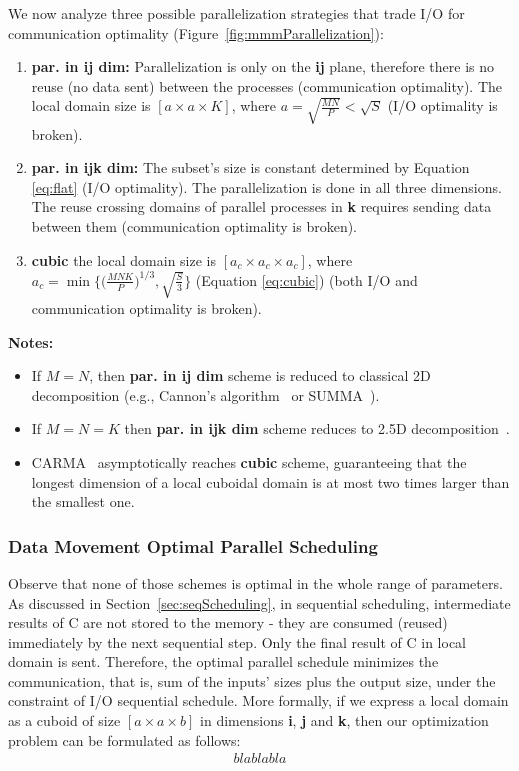 \documentclass[sigplan,review,anonymous]{acmart}\settopmatter{printfolios=true,printccs=false,printacmref=false}
\begin{document}
We now analyze three possible parallelization strategies that trade I/O for 
communication optimality (Figure~\ref{fig:mmmParallelization}):

\begin{enumerate}
	\item \textbf{par. in ij dim:} 
	Parallelization is only on the \textbf{ij} plane, therefore there is no 
	reuse 
	(no data sent) 
	between the processes (communication optimality). The local domain size is 
	$[a \times a \times K]$, where $a = \sqrt{\frac{MN}{P}} < \sqrt{S}$  (I/O 
	optimality is broken).
	\item \textbf{par. in ijk dim:} The subset's size is 
	constant determined by 
	Equation \ref{eq:flat} (I/O optimality). The parallelization is done in all 
	three dimensions. The reuse crossing domains of parallel processes in 
	\textbf{k} 
	requires sending data between them (communication optimality 
	is broken).
	\item \textbf{cubic} 
	the local domain size is 
	$[a_c \times a_c \times a_c]$, where $a_c = 
	\min\{\big(\frac{MNK}{P}\big)^{1/3}, 
	\sqrt{\frac{S}{3}}\}$ (Equation \ref{eq:cubic}) (both I/O and communication 
	optimality is broken).
\end{enumerate}

\textbf{Notes:}

\begin{itemize}
	\item If $M = N$, then \textbf{par. in ij dim} scheme is reduced to 
	classical 2D 
	decomposition (e.g., Cannon's algorithm~\cite{Cannon} or 
	SUMMA~\cite{summa}). 
	\item If $M = N = K$ then \textbf{par. in ijk dim} scheme reduces to 2.5D 
	decomposition~\cite{25d}.
	\item CARMA~\cite{CARMA} asymptotically reaches \textbf{cubic} scheme, 
	guaranteeing that 
	the longest dimension of a local cuboidal domain is at most two times 
	larger than the 
	smallest one.
\end{itemize}

\subsubsection{Data Movement Optimal Parallel Scheduling}
Observe that none of those schemes is optimal in the whole range of parameters.
As discussed in Section~\ref{sec:seqScheduling}, in sequential scheduling, 
intermediate results of C are not stored to the memory - they are consumed 
(reused) immediately by the next sequential step. Only the final result of C in 
local domain is sent. Therefore, the optimal parallel schedule minimizes the 
communication, that is, sum of the inputs' sizes plus the output size, under 
the constraint of I/O sequential schedule. More formally, if we express a local 
domain as a cuboid of size $[a \times a \times b]$ in dimensions \textbf{i}, 
\textbf{j} and \textbf{k}, then our optimization problem can be formulated as 
follows:
\begin{multline}
blablabla
\end{multline}
\end{document}
